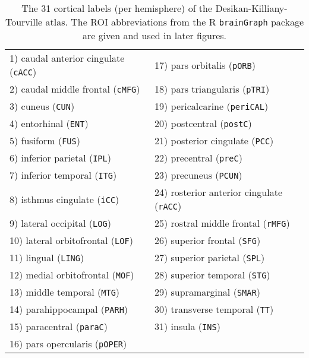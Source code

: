 
\begin{table}[!htb]
\centering
\caption{The 31 cortical labels (per hemisphere) of the Desikan-Killiany-Tourville atlas.
         The ROI abbreviations from the R {\tt brainGraph} package are given and used
         in later figures.
  }
\begin{tabular*}{0.75\textwidth}{@{\extracolsep{\fill}} l l}
  \toprule
  \midrule
  1) caudal anterior cingulate ({\tt cACC})  & 17) pars orbitalis ({\tt pORB}) \\
  2) caudal middle frontal ({\tt cMFG})      & 18) pars triangularis ({\tt pTRI}) \\
  3) cuneus ({\tt CUN})                      & 19) pericalcarine ({\tt periCAL}) \\
  4) entorhinal ({\tt ENT})                  & 20) postcentral ({\tt postC}) \\
  5) fusiform ({\tt FUS})                    & 21) posterior cingulate ({\tt PCC}) \\
  6) inferior parietal ({\tt IPL})           & 22) precentral ({\tt preC}) \\
  7) inferior temporal ({\tt ITG})           & 23) precuneus ({\tt PCUN}) \\
  8) isthmus cingulate ({\tt iCC})           & 24) rosterior anterior cingulate ({\tt rACC}) \\
  9) lateral occipital ({\tt LOG})           & 25) rostral middle frontal ({\tt rMFG}) \\
  10) lateral orbitofrontal ({\tt LOF})      & 26) superior frontal ({\tt SFG}) \\
  11) lingual ({\tt LING})                   & 27) superior parietal ({\tt SPL}) \\
  12) medial orbitofrontal ({\tt MOF})       & 28) superior temporal ({\tt STG}) \\
  13) middle temporal ({\tt MTG})            & 29) supramarginal ({\tt SMAR}) \\
  14) parahippocampal ({\tt PARH})           & 30) transverse temporal ({\tt TT}) \\
  15) paracentral ({\tt paraC})              & 31) insula ({\tt INS}) \\
  16) pars opercularis  ({\tt pOPER})        & {}\\
  \bottomrule
\end{tabular*}
\label{table:dkt_labels}
\end{table}

